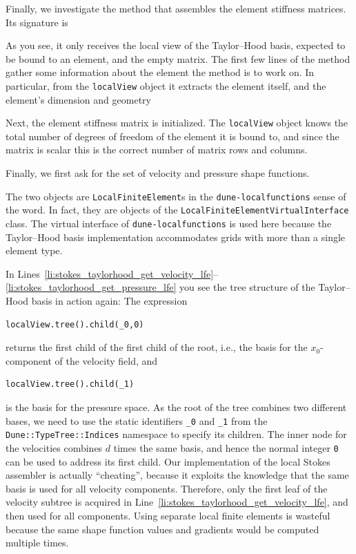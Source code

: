 \documentclass[a4paper,10pt,headings=normal,bibliography=totoc]{scrartcl}
\newcommand{\cpp}[1]{\lstinline[basicstyle=\ttfamily]!#1!}
\newcommand{\dunemodule}[1]{\texttt{#1}}
\begin{document}
Finally, we investigate the method that assembles the element stiffness matrices.  Its signature is
%

%
As you see, it only receives the local view of the Taylor--Hood basis, expected to be bound to an element,
and the empty matrix.
The first few lines of the method gather some information about the element the method is to work on.
In particular, from the \cpp{localView} object it extracts the element itself, and the element's dimension and
geometry
%

%
Next, the element stiffness matrix is initialized.  The \cpp{localView} object knows the total number of
degrees of freedom of the element it is bound to, and since the matrix is scalar this is the correct
number of matrix rows and columns.
%

%
Finally, we first ask for the set of velocity and pressure shape functions.
%

%
The two objects are \cpp{LocalFiniteElement}s in the \dunemodule{dune-localfunctions} sense of the word.
In fact, they are objects of the
\cpp{LocalFiniteElementVirtualInterface} class.  The virtual interface of \dunemodule{dune-localfunctions} is used here
because the Taylor--Hood basis implementation accommodates grids with more than a single element type.

In Lines~\ref{li:stokes_taylorhood_get_velocity_lfe}--\ref{li:stokes_taylorhood_get_pressure_lfe} you see the tree structure of the Taylor--Hood basis in action again:
The expression
\begin{lstlisting}[style=Example]
localView.tree().child(_0,0)
\end{lstlisting}
returns the first child of the first child of the root, i.e., the basis for the $x_0$-component of the velocity field,
and
\begin{lstlisting}[style=Example]
localView.tree().child(_1)
\end{lstlisting}
is the basis for the pressure space.
As the root of the tree combines two different bases, we need to use the static identifiers \cpp{_0} and \cpp{_1}
from the \cpp{Dune::TypeTree::Indices} namespace to specify its children.  The inner node for the velocities
combines $d$ times the same basis, and hence the normal integer \cpp{0} can be used to address its first child.
Our implementation of the local Stokes assembler is actually ``cheating'', because it exploits the knowledge
that the same basis is used for all velocity components.  Therefore, only the first leaf of the velocity
subtree is acquired in Line~\ref{li:stokes_taylorhood_get_velocity_lfe}, and then used for all components.
Using separate local finite elements is wasteful because the same shape function values and gradients
would be computed multiple times.
\end{document}
